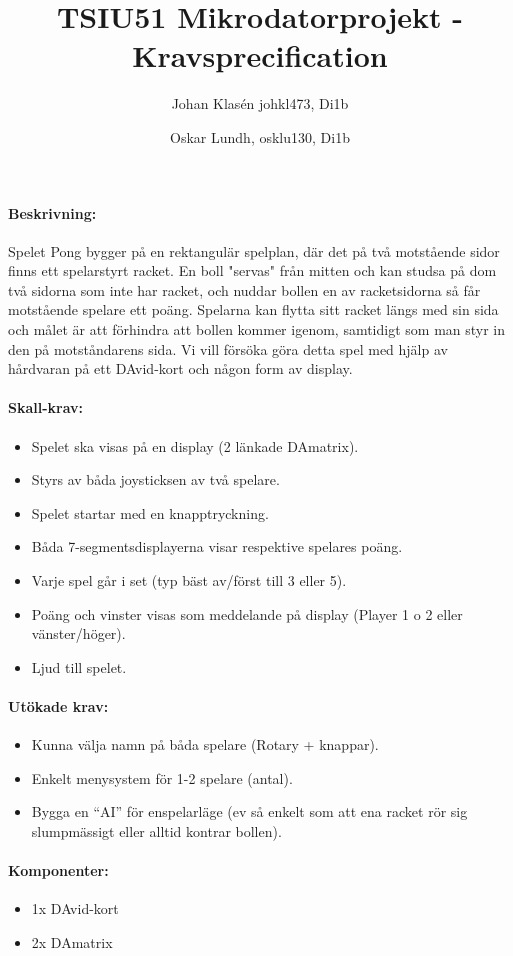 \documentclass{article}
\title{TSIU51 Mikrodatorprojekt - Kravsprecification}
\author{
	Johan Klasén johkl473, Di1b
	\and
	Oskar Lundh, osklu130, Di1b
	}
\date{}
\begin{document}
\maketitle

\paragraph{Beskrivning:}
Spelet Pong bygger på en rektangulär spelplan, där det på två motstående sidor finns ett spelarstyrt racket. En boll "servas" från mitten och kan studsa på dom två sidorna som inte har racket,
och nuddar bollen en av racketsidorna så får motstående spelare ett poäng. Spelarna kan flytta sitt racket längs med sin sida och målet är att förhindra att bollen kommer igenom, samtidigt som man styr in den på motståndarens sida.
Vi vill försöka göra detta spel med hjälp av hårdvaran på ett DAvid-kort och någon form av display.

\hfill

\paragraph{Skall-krav:}
\begin{itemize}
	\item Spelet ska visas på en display (2 länkade DAmatrix).
	\item Styrs av båda joysticksen av två spelare.
	\item Spelet startar med en knapptryckning.
	\item Båda 7-segmentsdisplayerna visar respektive spelares poäng.
	\item Varje spel går i set (typ bäst av/först till 3 eller 5).
	\item Poäng och vinster visas som meddelande på display (Player 1 o 2 eller vänster/höger).
	\item Ljud till spelet.
\end{itemize}

\paragraph{Utökade krav:}
\begin{itemize}
	\item Kunna välja namn på båda spelare (Rotary + knappar).
	\item Enkelt menysystem för 1-2 spelare (antal).
	\item Bygga en “AI” för enspelarläge (ev så enkelt som att ena racket rör sig slumpmässigt eller alltid kontrar bollen).

\end{itemize}


\paragraph{Komponenter:}
\begin{itemize}
	\item 1x DAvid-kort
	\item 2x DAmatrix
\end{itemize}
\end{document}
